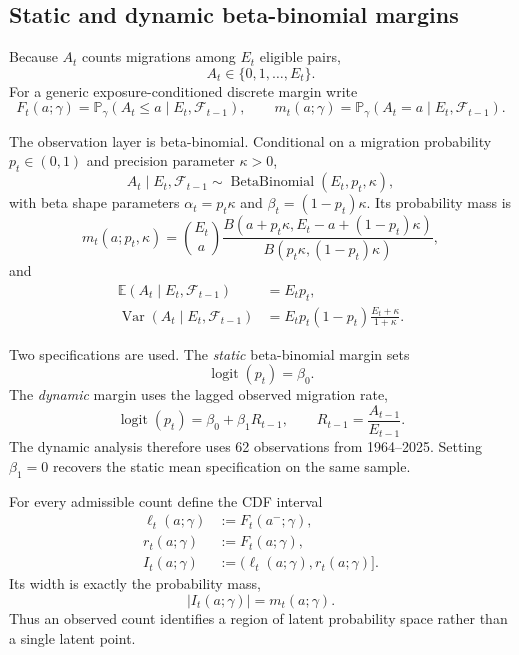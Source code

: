 \documentclass[11pt]{article}
\theoremstyle{definition}
\newcommand{\E}{\mathbb{E}}
\newcommand{\Pp}{\mathbb{P}}
\newcommand{\BB}{\operatorname{BetaBinomial}}
\newcommand{\logit}{\operatorname{logit}}
\begin{document}
\subsection{Static and dynamic beta-binomial margins}
\label{subsec:bbmargin}

Because $A_t$ counts migrations among $E_t$ eligible pairs,
\[
A_t\in\{0,1,\ldots,E_t\}.
\]
For a generic exposure-conditioned discrete margin write
\[
F_t(a;\gamma)=\Pp_\gamma(A_t\le a\mid E_t,\mathcal F_{t-1}),
\qquad
m_t(a;\gamma)=\Pp_\gamma(A_t=a\mid E_t,\mathcal F_{t-1}).
\]

The observation layer is beta-binomial. Conditional on a migration probability
$p_t\in(0,1)$ and precision parameter $\kappa>0$,
\begin{equation}
A_t\mid E_t,\mathcal F_{t-1}
\sim
\BB(E_t,p_t,\kappa),
\label{eq:bb-margin}
\end{equation}
with beta shape parameters $\alpha_t=p_t\kappa$ and
$\beta_t=(1-p_t)\kappa$. Its probability mass is
\begin{equation}
m_t(a;p_t,\kappa)
=
\binom{E_t}{a}
\frac{B(a+p_t\kappa,E_t-a+(1-p_t)\kappa)}
     {B(p_t\kappa,(1-p_t)\kappa)},
\label{eq:bb-pmf}
\end{equation}
and
\begin{align}
\E(A_t\mid E_t,\mathcal F_{t-1})&=E_t p_t,\\
\operatorname{Var}(A_t\mid E_t,\mathcal F_{t-1})
&=E_t p_t(1-p_t)\frac{E_t+\kappa}{1+\kappa}.
\label{eq:bb-var}
\end{align}

Two specifications are used. The \emph{static} beta-binomial margin sets
\begin{equation}
\logit(p_t)=\beta_0.
\label{eq:static-margin}
\end{equation}
The \emph{dynamic} margin uses the lagged observed migration rate,
\begin{equation}
\logit(p_t)=\beta_0+\beta_1 R_{t-1},
\qquad
R_{t-1}=\frac{A_{t-1}}{E_{t-1}}.
\label{eq:dynamic-margin}
\end{equation}
The dynamic analysis therefore uses 62 observations from 1964--2025. Setting
$\beta_1=0$ recovers the static mean specification on the same sample.

For every admissible count define the CDF interval
\begin{align}
\ell_t(a;\gamma)&:=F_t(a^-;\gamma),\\
r_t(a;\gamma)&:=F_t(a;\gamma),\\
I_t(a;\gamma)&:=\bigl(\ell_t(a;\gamma),r_t(a;\gamma)\bigr].
\label{eq:count-interval}
\end{align}
Its width is exactly the probability mass,
\begin{equation}
|I_t(a;\gamma)|=m_t(a;\gamma).
\label{eq:interval-width}
\end{equation}
Thus an observed count identifies a region of latent probability space rather than
a single latent point.
\end{document}
